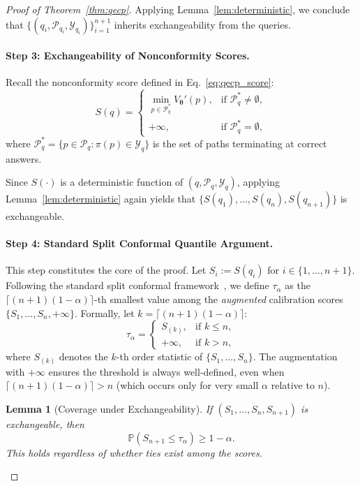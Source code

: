 \documentclass{article}
\theoremstyle{plain}
\newtheorem{lemma}[theorem]{Lemma}
\theoremstyle{definition}
\theoremstyle{remark}
\begin{document}
\begin{proof}[Proof of Theorem~\ref{thm:qecp}]
Applying Lemma~\ref{lem:deterministic}, we conclude that $\{(q_i, \mathcal{P}_{q_i}, \mathcal{Y}_{q_i})\}_{i=1}^{n+1}$ inherits exchangeability from the queries.

\paragraph{Step 3: Exchangeability of Nonconformity Scores.}
Recall the nonconformity score defined in Eq.~\eqref{eq:qecp_score}:
\[
S(q) = \begin{cases}
\min_{p \in \mathcal{P}^*_q} V_{\bm\theta}'(p), & \text{if } \mathcal{P}^*_q \neq \emptyset, \\
+\infty, & \text{if } \mathcal{P}^*_q = \emptyset,
\end{cases}
\]
where $\mathcal{P}^*_q = \{p \in \mathcal{P}_q : \pi(p) \in \mathcal{Y}_q\}$ is the set of paths terminating at correct answers.

Since $S(\cdot)$ is a deterministic function of $(q, \mathcal{P}_q, \mathcal{Y}_q)$, applying Lemma~\ref{lem:deterministic} again yields that $\{S(q_1), \ldots, S(q_n), S(q_{n+1})\}$ is exchangeable.

\paragraph{Step 4: Standard Split Conformal Quantile Argument.}
This step constitutes the core of the proof. Let $S_i := S(q_i)$ for $i \in \{1, \ldots, n+1\}$. Following the standard split conformal framework~\citep{cp_intro}, we define $\tau_\alpha$ as the $\lceil (n+1)(1-\alpha) \rceil$-th smallest value among the \emph{augmented} calibration scores $\{S_1, \ldots, S_n, +\infty\}$. Formally, let $k = \lceil (n+1)(1-\alpha) \rceil$:
\[
\tau_\alpha =
\begin{cases}
S_{(k)}, & \text{if } k \le n, \\
+\infty, & \text{if } k > n,
\end{cases}
\]
where $S_{(k)}$ denotes the $k$-th order statistic of $\{S_1, \ldots, S_n\}$. The augmentation with $+\infty$ ensures the threshold is always well-defined, even when $\lceil (n+1)(1-\alpha) \rceil > n$ (which occurs only for very small $\alpha$ relative to $n$).

\begin{lemma}[Coverage under Exchangeability]
\label{lem:coverage}
If $(S_1, \ldots, S_n, S_{n+1})$ is exchangeable, then
\[
\mathbb{P}(S_{n+1} \le \tau_\alpha) \ge 1 - \alpha.
\]
This holds regardless of whether ties exist among the scores.
\end{lemma}


\end{proof}
\end{document}
